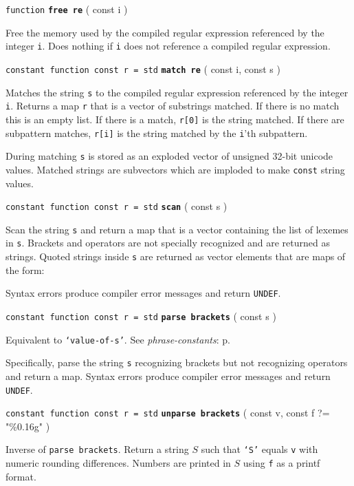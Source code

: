 \documentclass[12pt]{article}
\newcommand{\ttkey}[1]{{\tt \bfseries #1}}
\newcommand{\pagref}[1]{p\pageref{#1}}
\newenvironment{indpar}[1][0.3in]%
	{\begin{list}{}%
		     {\setlength{\itemsep}{0in}%
		      \setlength{\topsep}{0in}%
		      \setlength{\parsep}{1ex}%
		      \setlength{\labelwidth}{#1}%
		      \setlength{\leftmargin}{#1}%
		      \addtolength{\leftmargin}{\labelsep}}%
	 \item}%
	{\end{list}}
\begin{document}
{\tt function} \ttkey{free re} ( const i )
\begin{indpar}
Free the memory used by the compiled regular expression
referenced by the integer {\tt i}.  Does nothing if {\tt i}
does not reference a compiled regular expression.
\end{indpar}

{\tt constant function const r = std} \ttkey{match re} ( const i, const s  )
\begin{indpar}
Matches the string {\tt s} to the compiled regular expression
referenced by the integer {\tt i}.
Returns a map {\tt r} that is a vector of substrings matched.
If there is no match this is an empty list.  If there is
a match, {\tt r[0]} is the string matched.  If there are
subpattern matches, {\tt r[i]} is the string matched by the
{\tt i}'th subpattern.

During matching {\tt s} is stored as an exploded vector of
unsigned 32-bit unicode values.  Matched strings are
subvectors which are imploded to make {\tt const} string values.
\end{indpar}

{\tt constant function const r = std} \ttkey{scan} ( const s  )
\begin{indpar}
Scan the string {\tt s} and return a map that is a vector
containing the list of lexemes in {\tt s}.  Brackets and
operators are not specially recognized and are returned
as strings.  Quoted strings inside {\tt s} are returned
as vector elements that are maps of the form: \\

Syntax errors produce compiler error messages and
return {\tt UNDEF}.
\end{indpar}

{\tt constant function const r = std} \ttkey{parse brackets} ( const s  )
\begin{indpar}
Equivalent to {\tt `{\rm \em value-of-}s'}.
See {\em phrase-constants}: \pagref{PHRASE-CONSTANT}.

Specifically, parse the string {\tt s} recognizing brackets
but not recognizing operators and return a map.
Syntax errors produce compiler error messages and
return {\tt UNDEF}.
\end{indpar}

{\tt constant function const r = std} \ttkey{unparse brackets}
	( const v, const f ?= "\%0.16g"  )
\begin{indpar}
Inverse of {\tt parse brackets}.  Return a string $S$ such
that {\tt `$S$'} equals {\tt v} with numeric rounding differences.
Numbers are printed in $S$ using {\tt f} as a printf format.
\end{indpar}
\end{document}
